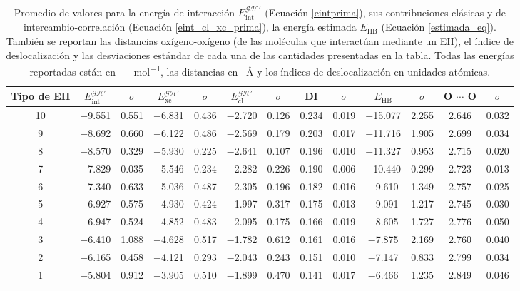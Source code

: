 \begin{table}[h]
  \centering
    \caption{Promedio de valores para la energía de interacción
    $E_{\mathrm{int}}^{\mathscr{GH}\, \prime}$ (Ecuación \ref{eintprima}), sus
    contribuciones clásicas y de intercambio-correlación (Ecuación
    \ref{eint_cl_xc_prima}), la energía estimada $E_{\mathrm{HB}}$ (Ecuación
    \ref{estimada_eq}). También se reportan las distancias oxígeno-oxígeno (de las
    moléculas que interactúan mediante un EH), el índice de deslocalización y las
    desviaciones estándar de cada una de las cantidades presentadas en la tabla.
    Todas las energías reportadas están en \SI{}{\kilo\calorie\per\mole}, las
    distancias en \SI{}{\angstrom} y los índices de deslocalización en unidades
    atómicas.}
  \begin{adjustbox}{max width=1.1\textwidth,center}
  \scriptsize
    \begin{tabular}{c|cc|cc|cc|cc|cc|cc}
    \hline
    Tipo de EH & $E_{\mathrm{int}}^{\mathscr{GH'}}$ & $\sigma$ 
    & $E_{\mathrm{xc}}^{\mathscr{GH'}}$ & $\sigma$ & $E_{\mathrm{cl}}^{\mathscr{GH}'}$ &
    $\sigma$ & DI    & $\sigma$ & $E_\mathrm{HB}$ & $\sigma$ & O $\cdots$ O & $\sigma$ \\
    \hline
    10         & $-$9.551 & 0.551 & $-$6.831 & 0.436    & $-$2.720  & 0.126    & 0.234 & 0.019    & $-$15.077 & 2.255	& 2.646	& 0.032 \\
    9          & $-$8.692 & 0.660 & $-$6.122 & 0.486    & $-$2.569  & 0.179    & 0.203 & 0.017    & $-$11.716 & 1.905	& 2.699 & 0.034 \\
    8          & $-$8.570 & 0.329 & $-$5.930 & 0.225    & $-$2.641  & 0.107    & 0.196 & 0.010    & $-$11.327 & 0.953	& 2.715 & 0.020 \\
    7          & $-$7.829 & 0.035 & $-$5.546 & 0.234    & $-$2.282  & 0.226    & 0.190 & 0.006    & $-$10.440 & 0.299	& 2.723 & 0.013 \\
    6          & $-$7.340 & 0.633 & $-$5.036 & 0.487    & $-$2.305  & 0.196    & 0.182 & 0.016    & $-$9.610  & 1.349	& 2.757 & 0.025 \\
    5          & $-$6.927 & 0.575 & $-$4.930 & 0.424    & $-$1.997  & 0.317    & 0.175 & 0.013    & $-$9.091  & 1.217	& 2.745 & 0.030 \\
    4          & $-$6.947 & 0.524 & $-$4.852 & 0.483    & $-$2.095  & 0.175    & 0.166 & 0.019    & $-$8.605  & 1.727	& 2.776 & 0.050 \\
    3          & $-$6.410 & 1.088 & $-$4.628 & 0.517    & $-$1.782  & 0.612    & 0.161 & 0.016    & $-$7.875  & 2.169	& 2.760 & 0.040 \\
    2          & $-$6.165 & 0.458 & $-$4.121 & 0.293    & $-$2.043  & 0.243    & 0.151 & 0.010    & $-$7.147  & 0.833	& 2.799 & 0.034 \\
    1          & $-$5.804 & 0.912 & $-$3.905 & 0.510    & $-$1.899  & 0.470    & 0.141 & 0.017    & $-$6.466  & 1.235	& 2.849 & 0.046 \\
    \hline
    \end{tabular}
  \end{adjustbox}
\end{table}

\newpage
\thispagestyle{empty}
